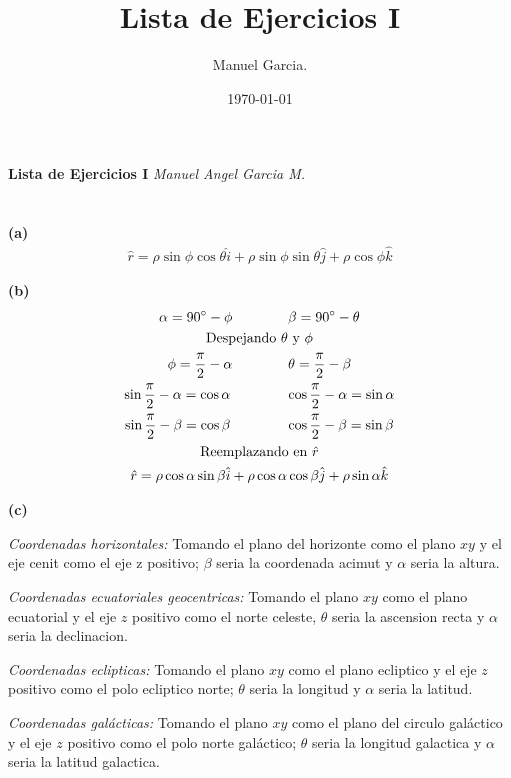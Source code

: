 \documentclass{article}
\title{Lista de Ejercicios I }
\author{Manuel Garcia.}
\date{\today}
\begin{document}
\textbf{Lista de Ejercicios I }\hfill \textit{Manuel Angel Garcia M.}

\section{}

\hfill 

\textbf{(a)}
\begin{gather*}
  \hat r = \rho \sin{\phi } \cos{\theta} \hat i + \rho \sin{\phi } \sin{\theta} \hat j + \rho \cos{\phi } \hat k 
\end{gather*}

\textbf{(b)}
\begin{gather*}
  \alpha = 90\degree - \phi \qquad \qquad \beta = 90\degree - \theta \\
  \text{Despejando }\theta \text{ y } \phi\\
  \phi = \frac{\pi}{2} - \alpha \qquad \qquad \theta = \frac{\pi}{2} - \beta \\
  \sin{\frac{\pi}{2} - \alpha} = \cos{\alpha} \qquad \qquad \cos{\frac{\pi}{2} - \alpha} = \sin{\alpha}\\
  \sin{\frac{\pi}{2} - \beta} = \cos{\beta} \qquad \qquad \cos{\frac{\pi}{2} - \beta} = \sin{\beta}\\
  \text{Reemplazando en }\hat r \\
  \hat r = \rho \cos{\alpha} \sin{\beta} \hat i + \rho \cos{\alpha} \cos{\beta} \hat j + \rho \sin{\alpha} \hat k
\end{gather*}

\textbf{(c) } 

\hfill

\textit{Coordenadas horizontales:} Tomando el plano del horizonte como el plano $ xy  $ y el eje cenit como el eje z positivo; $ \beta $ seria la coordenada acimut y $ \alpha $ seria la altura.

\hfill

\textit{Coordenadas ecuatoriales geocentricas:} Tomando el plano $ xy  $ como el plano ecuatorial y el eje $ z  $ positivo como el norte celeste, $ \theta  $ seria la ascension recta y $ \alpha $ seria la declinacion.

\hfill

\textit{Coordenadas eclipticas:} Tomando el plano $ xy  $ como el plano ecliptico y el eje $ z  $ positivo como el polo ecliptico norte; $ \theta  $ seria la longitud y $ \alpha $ seria la latitud.

\hfill

\textit{Coordenadas galácticas:} Tomando el plano $ xy  $ como el plano del circulo galáctico y el eje $ z  $ positivo como el polo norte galáctico; $ \theta  $ seria la longitud galactica y $ \alpha $ seria la latitud galactica.
\end{document}
